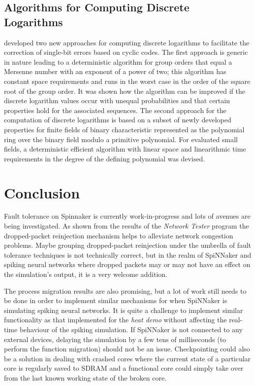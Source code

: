\documentclass[oneside, a4paper, 11pt]{memoir}
\newlength\drop
\begin{document}
\section{Algorithms for Computing Discrete Logarithms}
\citet{grymel2013error} developed two new approaches for computing discrete logarithms to facilitate the correction of single-bit errors based on cyclic codes. The first approach is generic in nature leading to a deterministic algorithm for group orders that equal a Mersenne number with an exponent of a power of two; this algorithm has constant space requirements and runs in the worst case in the order of the square root of the group order. It was shown how the algorithm can be improved if the discrete logarithm values occur with unequal probabilities and that certain properties hold for the associated sequences. The second approach for the computation of discrete logarithms is based on a subset of newly developed properties for finite fields of binary characteristic represented as the polynomial ring over the binary field modulo a primitive polynomial. For evaluated small fields, a deterministic efficient algorithm with linear space and linearithmic time requirements in the degree of the defining polynomial was devised.

\chapter{Conclusion}
Fault tolerance on Spinnaker is currently work-in-progress and lots of avenues are being investigated. As shown from the results of the \emph{Network Tester} program the dropped-packet reinjection mechanism helps to alleviate network congestion problems. Maybe grouping dropped-packet reinjection under the umbrella of fault tolerance techniques is not technically correct, but in the realm of SpiNNaker and spiking neural networks where dropped packets may or may not have an effect on the simulation's output, it is a very welcome addition.

The process migration results are also promising, but a lot of work still needs to be done in order to implement similar mechanisms for when SpiNNaker is simulating spiking neural networks. It is quite a challenge to implement similar functionality as that implemented for the \emph{heat demo} without affecting the real-time behaviour of the spiking simulation. If SpiNNaker is not connected to any external devices, delaying the simulation by a few tens of milliseconds (to perform the function migration) should not be an issue. Checkpointing could also be a solution in dealing with crashed cores where the current state of a particular core is regularly saved to SDRAM and a functional core could simply take over from the last known working state of the broken core.
\end{document}
